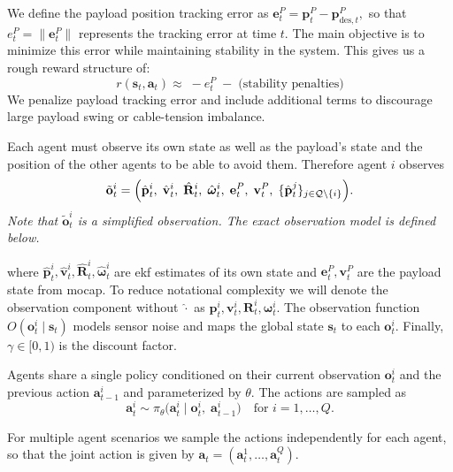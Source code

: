 We define the payload position tracking error as
$
\mathbf{e}^P_t = \mathbf{p}^P_t - \mathbf{p}^P_{\mathrm{des},t},
$
so that $e^P_t = \|\mathbf{e}^P_t\|$ represents the tracking error at time $t$. The main objective is to minimize this error while maintaining stability in the system. This gives us a rough reward structure of:
\begin{equation}
 r(\mathbf{s}_t,\mathbf{a}_t) \approx\; - e^P_t \;-\; \text{(stability penalties)}
\end{equation}
We penalize payload tracking error and include additional terms to discourage large payload swing or cable-tension imbalance.

Each agent must observe its own state as well as the payload's state and the position of the other agents to be able to avoid them. Therefore agent $i$ observes
\begin{equation}
    \label{eq:obs}
    \tilde{\mathbf{o}}^i_t 
    = \Bigl(
      \hat{\mathbf{p}}^i_t,\;
      \hat{\mathbf{v}}^i_t,\;
      \hat{\mathbf{R}}^i_t,\;
      \hat{\boldsymbol{\omega}}^i_t,\;
      \mathbf{e}^P_t,\;
      \mathbf{v}^P_t,\;
      \{\hat{\mathbf{p}}^j_t\}_{j \in \mathcal{Q}\setminus\{i\}}
    \Bigr).
\end{equation}
\emph{Note that \(\tilde{\mathbf{o}}^i_t\) is a simplified observation. The exact observation model is defined below.}

where $\hat{\mathbf{p}}^i_t,\hat{\mathbf{v}}^i_t,\hat{\mathbf{R}}^i_t,\hat{\boldsymbol{\omega}}^i_t$ are \gls{ekf} estimates of its own state and $\mathbf{e}^P_t,\mathbf{v}^P_t$ are the payload state from \gls{mocap}. To reduce notational complexity we will denote the observation component without $\hat{\cdot}$ as $\mathbf{p}^i_t,\mathbf{v}^i_t,\mathbf{R}^i_t,\boldsymbol{\omega}^i_t$. The observation function $O(\mathbf{o}^i_t \mid \mathbf{s}_t)$ models sensor noise and maps the global state $\mathbf{s}_t$ to each $\mathbf{o}^i_t$. Finally, $\gamma \in [0,1)$ is the discount factor.

Agents share a single policy conditioned on their current observation \(\mathbf{o}^i_t\) and the previous action \(\mathbf{a}^i_{t-1}\) and parameterized by \(\theta\). The actions are sampled as
\begin{equation}
  \mathbf{a}^i_t \sim \pi_{\theta}\bigl(\mathbf{a}^i_t \mid \mathbf{o}^i_t,\;\mathbf{a}^i_{t-1}\bigr)
  \quad\text{for }i=1,\dots,Q.
\end{equation}


For multiple agent scenarios we sample the actions independently for each agent, so that the joint action is given by $\mathbf{a}_t = (\mathbf{a}^1_t,\dots,\mathbf{a}^Q_t)$.


